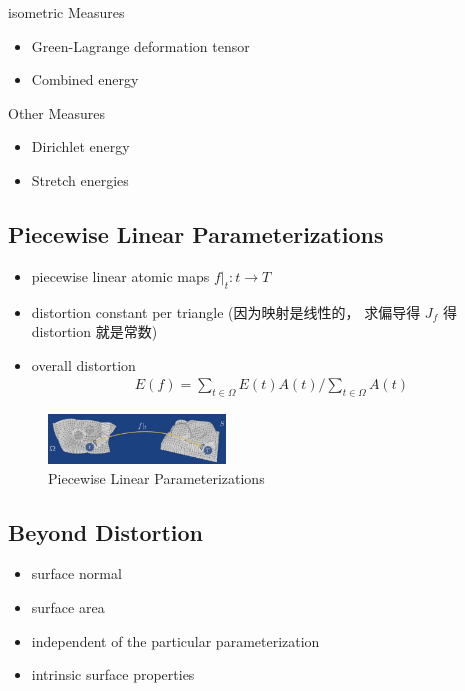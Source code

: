 isometric Measures
\begin{itemize}
    \item Green-Lagrange deformation tensor
    \item Combined energy
\end{itemize}

Other Measures
\begin{itemize}
    \item Dirichlet energy
    \item Stretch energies
\end{itemize}

\subsection{Piecewise Linear Parameterizations}

\begin{itemize}
    \item piecewise linear atomic maps $f|_t:t\to T$
    \item distortion constant per triangle (因为映射是线性的， 求偏导得 $J_f$ 得 distortion 就是常数)
    \item overall distortion
    \begin{align*}
        E(f)=\sum_{t\in\Omega}E(t)A(t)\bigg/\sum_{t\in\Omega}A(t)
    \end{align*}
\end{itemize}

\begin{figure}[!htb]
    \centering
    \includegraphics[width=0.42\textwidth]{pic/ACG2/Piecewise Linear Parameterizations}
    \caption{Piecewise Linear Parameterizations}
\end{figure}

\subsection{Beyond Distortion}
\begin{itemize}
    \item surface normal 
    \item surface area
    \item independent of the particular parameterization
    \item intrinsic surface properties
\end{itemize}

